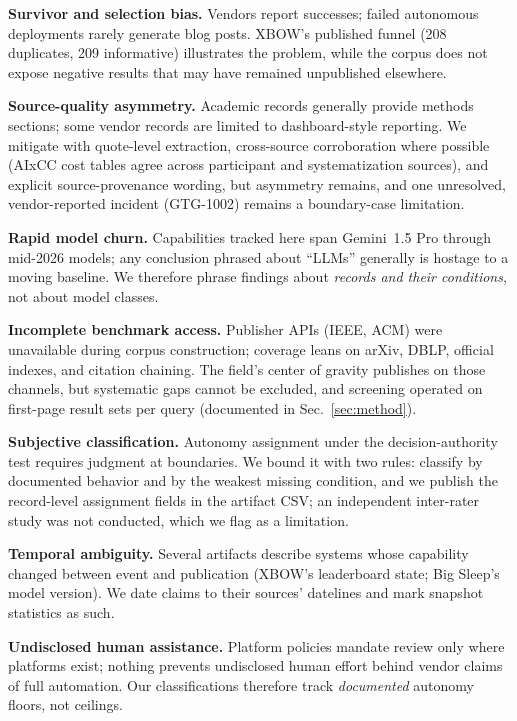 \documentclass[conference,compsoc]{IEEEtran}
\begin{document}
\textbf{Survivor and selection bias.} Vendors report successes; failed autonomous deployments
rarely generate blog posts. XBOW's published funnel (208 duplicates, 209 informative) illustrates
the problem, while the corpus does not expose negative results that may have remained unpublished
elsewhere.

\textbf{Source-quality asymmetry.} Academic records generally provide methods sections; some
vendor records are limited to dashboard-style reporting. We mitigate with quote-level extraction,
cross-source corroboration where possible (AIxCC cost tables agree across participant and
systematization sources), and explicit source-provenance wording, but asymmetry remains, and
one unresolved, vendor-reported incident (GTG-1002) remains a boundary-case limitation.

\textbf{Rapid model churn.} Capabilities tracked here span Gemini~1.5 Pro through mid-2026
models; any conclusion phrased about ``LLMs'' generally is hostage to a moving baseline. We
therefore phrase findings about \emph{records and their conditions}, not about model classes.

\textbf{Incomplete benchmark access.} Publisher APIs (IEEE, ACM) were unavailable during corpus
construction; coverage leans on arXiv, DBLP, official indexes, and citation chaining. The
field's center of gravity publishes on those channels, but systematic gaps cannot be excluded,
and screening operated on first-page result sets per query (documented in
Sec.~\ref{sec:method}).

\textbf{Subjective classification.} Autonomy assignment under the decision-authority test
requires judgment at boundaries. We bound it with two rules: classify by documented behavior
and by the weakest missing condition, and we publish the record-level assignment fields in
the artifact CSV; an independent inter-rater study was not conducted, which we flag as a limitation.

\textbf{Temporal ambiguity.} Several artifacts describe systems whose capability changed
between event and publication (XBOW's leaderboard state; Big Sleep's model version). We date
claims to their sources' datelines and mark snapshot statistics as such.

\textbf{Undisclosed human assistance.} Platform policies mandate review only where platforms
exist; nothing prevents undisclosed human effort behind vendor claims of full automation. Our
classifications therefore track \emph{documented} autonomy floors, not ceilings.
\end{document}
